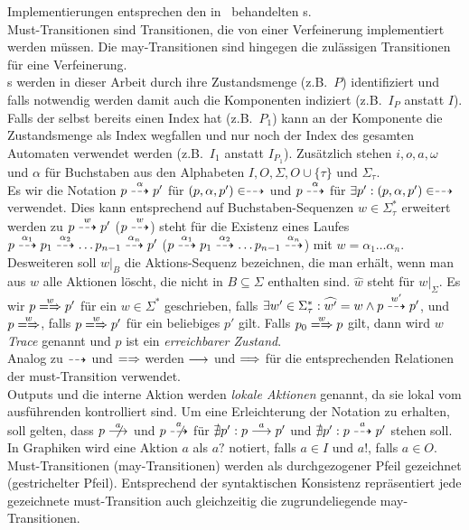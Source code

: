 Implementierungen entsprechen den in~\cite{Schinko2016BA} behandelten
\EIO{}s.\\
Must-Transitionen sind Transitionen, die von einer Verfeinerung implementiert
werden müssen. Die may-Transitionen sind hingegen die zulässigen Transitionen
für eine Verfeinerung.\\
\MEIO{}s  werden in dieser Arbeit durch ihre Zustandsmenge (z.B.\ $P$)
identifiziert und falls notwendig werden damit auch die Komponenten indiziert
(z.B.\ $I_P$ anstatt $I$). Falls der \MEIO{} selbst bereits einen Index hat
(z.B.\ $P_1$) kann an der Komponente die Zustandsmenge als Index wegfallen und
nur noch der Index des gesamten Automaten verwendet werden (z.B.\ $I_1$ anstatt
$I_{P_1}$). Zusätzlich stehen $i,o,a,\omega$ und $\alpha$ für Buchstaben aus
den Alphabeten $I,O,\Sigma ,O\cup\{\tau\}$ und $\Sigma_\tau$.\\
Es wir die Notation $p\may[\alpha] p'$ für $(p,\alpha,p')\in\may$ und
$p\may[\alpha]$ für $\exists p':(p,\alpha,p')\in\may$ verwendet. Dies kann
entsprechend auf Buchstaben-Sequenzen $w\in\Sigma_{\tau}^*$ erweitert werden zu
$p\may[w]p'$ ($p\may[w]$) steht für die Existenz eines Laufes $p\may[\alpha _1]
p_1\may[\alpha _2]\dots p_{n-1}\may[\alpha _n] p'$ ($p\may[\alpha _1]
p_1\may[\alpha _2]\dots p_{n-1}\may[\alpha _n]$) mit $w=\alpha _1\dots \alpha
_n$.\\
Desweiteren soll $w|_B$ die Aktions-Sequenz bezeichnen, die man erhält, wenn
man aus $w$ alle Aktionen löscht, die nicht in $B\subseteq\Sigma$ enthalten
sind. $\widehat{w}$ steht für $w|_{\Sigma}$. Es wir $p\weakmay[w] p'$
für ein $w\in\Sigma ^*$ geschrieben, falls $\exists
w'\in\Sigma_{\tau}^*:\widehat{w'}=w\land p\may[w']p'$, und $p\weakmay[w]$,
falls $p\weakmay[w] p'$ für ein beliebiges $p'$ gilt. Falls $p_0\weakmay[w] p$
gilt, dann wird $w$ \emph{Trace} genannt und $p$ ist ein \emph{erreichbarer
Zustand}.\\
Analog zu $\may$ und $\weakmay$ werden $\must$ und $\weakmust$ für die
entsprechenden Relationen der must-Transition verwendet.\\
Outputs und die interne Aktion werden \emph{lokale Aktionen} genannt, da sie
lokal vom ausführenden \MEIO{} kontrolliert sind. Um eine Erleichterung der
Notation zu erhalten, soll gelten, dass $p\nmust[a]$ und $p\nmay[a]$ für
$\nexists p': p\must[a]p'$ und $\nexists p': p\may[a]p'$ stehen soll. In
Graphiken wird eine Aktion $a$ als $a?$ notiert, falls $a\in I$ und $a!$, falls
$a\in O$. Must-Transitionen (may-Transitionen) werden als durchgezogener Pfeil
gezeichnet (gestrichelter Pfeil). Entsprechend der syntaktischen Konsistenz
repräsentiert jede gezeichnete must-Transition auch gleichzeitig die
zugrundeliegende may-Transitionen.

